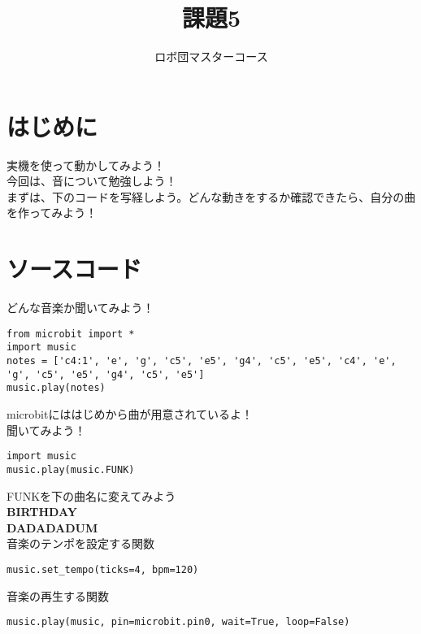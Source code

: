 \documentclass[dvipdfmx]{jsarticle}
\begin{document}
\title{課題5}
\author{ロボ団マスターコース}
\maketitle

\section{はじめに}
実機を使って動かしてみよう！\\
今回は、音について勉強しよう！\\
まずは、下のコードを写経しよう。どんな動きをするか確認できたら、自分の曲を作ってみよう！\\
\section{ソースコード}
どんな音楽か聞いてみよう！
\begin{lstlisting} 
from microbit import *
import music
notes = ['c4:1', 'e', 'g', 'c5', 'e5', 'g4', 'c5', 'e5', 'c4', 'e', 'g', 'c5', 'e5', 'g4', 'c5', 'e5']
music.play(notes)
\end{lstlisting}
microbitにははじめから曲が用意されているよ！\\
聞いてみよう！
\begin{lstlisting} 
import music
music.play(music.FUNK)
\end{lstlisting}
FUNKを下の曲名に変えてみよう\\
\> \textbf{BIRTHDAY}\\
\> \textbf{DADADADUM}\\

音楽のテンポを設定する関数
\begin{lstlisting} 
music.set_tempo(ticks=4, bpm=120)
\end{lstlisting}
音楽の再生する関数
\begin{lstlisting} 
music.play(music, pin=microbit.pin0, wait=True, loop=False)
\end{lstlisting}
\end{document}
